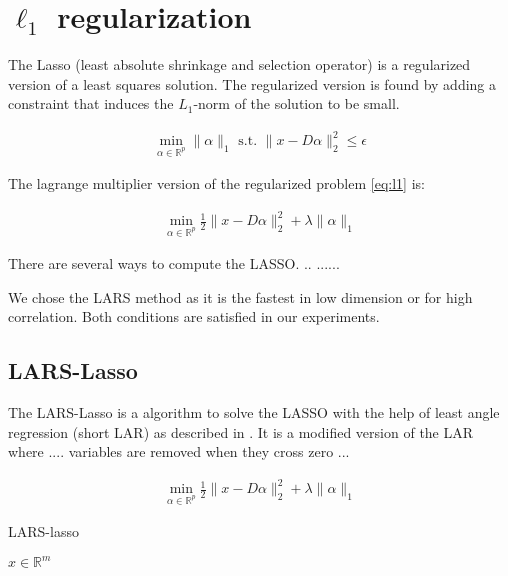 \section {$\ell_1$ regularization}



The Lasso (least absolute shrinkage and selection operator) is a regularized version of a least squares solution.
The regularized version is found by adding a constraint that induces the $L_1$-norm of the solution to be small. \cite{Tibshirani1998}

\begin{align}
\min_{\alpha\in\mathbb{R}^{p}}   \lVert \alpha \rVert_{1}   \textrm{ s.t. } \lVert x - D\alpha \rVert^{2}_{2} \leq \epsilon\label{eq:l1}
\end{align}

The lagrange multiplier version of the regularized problem \ref{eq:l1} is:

\begin{align}
\min_{\alpha\in\mathbb{R}^{p}}  \frac{1}{2} \lVert x - D\alpha \rVert^{2}_{2} + \lambda \lVert \alpha \rVert_{1}
\end{align}

There are several ways to compute the LASSO. .. ...... 


We chose the LARS method as it is the fastest in low dimension or for high correlation. Both conditions are satisfied in our experiments.

\subsection {LARS-Lasso}
\label{sec:lars}
The LARS-Lasso is a algorithm to solve the LASSO with the help of least angle regression (short LAR)
as described in \cite{Efron2004}. It is a modified version of the LAR where .... variables are removed when they cross zero ...


\begin{align}
\min_{\alpha\in\mathbb{R}^{p}}  \frac{1}{2} \lVert x - D\alpha \rVert^{2}_{2} + \lambda \lVert \alpha \rVert_{1}
\end{align}

\begin{algorithm}
\caption{LARS-lasso}
\begin{algorithmic}[1]
\REQUIRE $x \in \mathbb{R}^m$
\end{algorithmic}
\end{algorithm}

